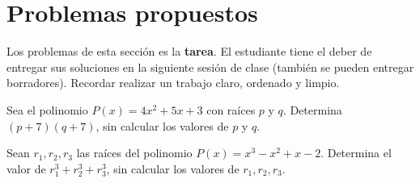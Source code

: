 \section{Problemas propuestos}

Los problemas de esta sección es la \textbf{tarea}.
El estudiante tiene el deber de entregar sus soluciones en la siguiente sesión de clase (también se pueden entregar borradores).
Recordar realizar un trabajo claro, ordenado y limpio.

\showLine
\begin{multicols}{2}
    \begin{problem}
        Sea el polinomio $P(x) = 4x^2 + 5x + 3$ con raíces $p$ y $q$.
        Determina $(p + 7)(q + 7)$, sin calcular los valores de $p$ y $q$.
    \end{problem}

    \begin{problem}
        Sean $r_1, r_2, r_3$ las raíces del polinomio $P(x) = x^3 - x^2 + x - 2$.
        Determina el valor de $r^3_1 + r^3_2 + r^3_3$, sin calcular los valores de $r_1, r_2, r_3$.
    \end{problem}
\end{multicols}
